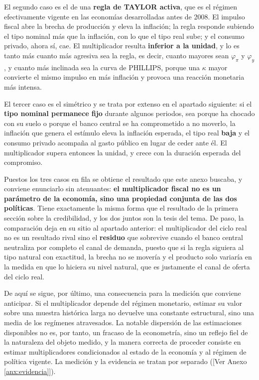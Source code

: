 \documentclass[10pt,a4paper]{article}
\newcommand{\authorfont}[1]{{\fontfamily{EBGaramond-TLF}\selectfont #1}}
\newcounter{anexo}
\begin{document}
El segundo caso es el de una \textbf{regla de TAYLOR activa}, que es el régimen efectivamente vigente en las economías desarrolladas antes de 2008. El impulso fiscal abre la brecha de producción y eleva la inflación; la regla responde subiendo el tipo nominal más que la inflación, con lo que el tipo real sube; y el consumo privado, ahora sí, cae. El multiplicador resulta \textbf{inferior a la unidad}, y lo es tanto más cuanto más agresiva sea la regla, es decir, cuanto mayores sean $\varphi_{\pi}$ y $\varphi_{y}$, y cuanto más inclinada sea la curva de PHILLIPS, porque una $\kappa$ mayor convierte el mismo impulso en más inflación y provoca una reacción monetaria más intensa.

El tercer caso es el simétrico y se trata por extenso en el apartado siguiente: si el \textbf{tipo nominal permanece fijo} durante algunos periodos, sea porque ha chocado con su suelo o porque el banco central se ha comprometido a no moverlo, la inflación que genera el estímulo eleva la inflación esperada, el tipo real \textbf{baja} y el consumo privado acompaña al gasto público en lugar de ceder ante él. El multiplicador supera entonces la unidad, y crece con la duración esperada del compromiso.

Puestos los tres casos en fila se obtiene el resultado que este anexo buscaba, y conviene enunciarlo sin atenuantes: \textbf{el multiplicador fiscal no es un parámetro de la economía, sino una propiedad conjunta de las dos políticas}. Tiene exactamente la misma forma que el resultado de la primera sección sobre la credibilidad, y los dos juntos son la tesis del tema. De paso, la comparación deja en su sitio al apartado anterior: el multiplicador del ciclo real no es un resultado rival sino el \textbf{residuo} que sobrevive cuando el banco central neutraliza por completo el canal de demanda, puesto que si la regla siguiera al tipo natural con exactitud, la brecha no se movería y el producto solo variaría en la medida en que lo hiciera su nivel natural, que es justamente el canal de oferta del ciclo real.

De aquí se sigue, por último, una consecuencia para la medición que conviene anticipar. Si el multiplicador depende del régimen monetario, estimar su valor sobre una muestra histórica larga no devuelve una constante estructural, sino una media de los regímenes atravesados. La notable dispersión de las estimaciones disponibles no es, por tanto, un fracaso de la econometría, sino un reflejo fiel de la naturaleza del objeto medido, y la manera correcta de proceder consiste en estimar multiplicadores condicionados al estado de la economía y al régimen de política vigente. La medición y la evidencia se tratan por separado ([\authorfont{Ver Anexo \ref{anx:evidencia}}]).
\end{document}
